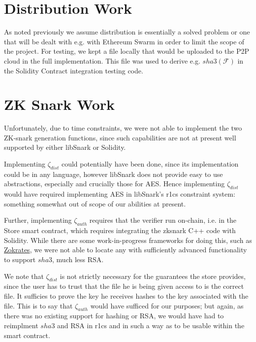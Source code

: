 \documentclass[12pt,oneside]{amsart}
\def\file{\mathcal{F}}
\def\hash{sha3}
\def\zksnark{\zeta}
\begin{document}
\begin{multicols}{2}
\section{Distribution Work} \label{ch:distribution_work}

As noted previously we assume distribution is essentially a solved problem or one that will be dealt with e.g. with Ethereum Swarm in order to limit the scope of the project.
For testing, we kept a file locally that would be uploaded to the P2P cloud in the full implementation.
This file was used to derive e.g. $\hash(\file)$ in the Solidity Contract integration testing code.

\section{ZK Snark Work}\label{ch:zksnark_work}

Unfortunately, due to time constraints, we were not able to implement the two ZK-snark generation functions, since such capabilities are not at present well supported by either libSnark or Solidity.

Implementing $\zksnark_{dist}$ could potentially have been done, since its implementation could be in any language, however libSnark does not provide easy to use abstractions, especially and crucially those for AES. Hence implementing $\zksnark_{dist}$ would have required implementing AES in libSnark's r1cs constraint system: something somewhat out of scope of our abilities at present.

Further, implementing $\zksnark_{auth}$ requires that the verifier run on-chain, i.e. in the Store smart contract, which requires integrating the zksnark C++ code with Solidity.
While there are some work-in-progress frameworks for doing this, such as \href{https://github.com/JacobEberhardt/ZoKrates}{Zokrates}, we were not able to locate any with sufficiently advanced functionality to support $\hash$, much less RSA.

We note that $\zksnark_{dist}$ is not strictly necessary for the guarantees the store provides, since the user has to trust that the file he is being given access to is the correct file.
It sufficies to prove the key he receives hashes to the key associated with the file.
This is to say that $\zksnark_{auth}$ would have sufficed for our purposes; but again, as there was no existing support for hashing or RSA, we would have had to reimplment $\hash$ and RSA in r1cs and in such a way as to be usable within the smart contract.


\end{multicols}
\end{document}
